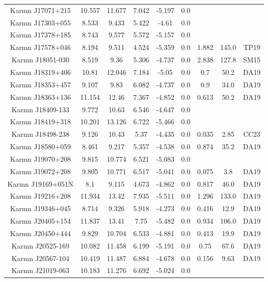\begin{longtable}{ccccccccc}
    Karmn J17071+215 & 10.557 & 11.677 & 7.042 & -5.197 & 0.0 &  &  &  \\
    Karmn J17303+055 & 8.533 & 9.433 & 5.422 & -4.61 & 0.0 &  &  &  \\
    Karmn J17378+185 & 8.743 & 9.577 & 5.572 & -5.157 & 0.0 &  &  &  \\
    Karmn J17578+046 & 8.194 & 9.511 & 4.524 & -5.359 & 0.0 & 1.882 & 145.0 & TP19 \\
    Karmn J18051-030 & 8.519 & 9.36 & 5.306 & -4.737 & 0.0 & 2.838 & 127.8 & SM15 \\
    Karmn J18319+406 & 10.81 & 12.046 & 7.184 & -5.05 & 0.0 & 0.7 & 50.2 & DA19 \\
    Karmn J18353+457 & 9.107 & 9.83 & 6.082 & -4.737 & 0.0 & 0.9 & 34.0 & DA19 \\
    Karmn J18363+136 & 11.154 & 12.46 & 7.367 & -4.852 & 0.0 & 0.613 & 50.2 & DA19 \\
    Karmn J18409-133 & 9.772 & 10.63 & 6.546 & -4.647 & 0.0 &  &  &  \\
    Karmn J18419+318 & 10.201 & 13.126 & 6.722 & -5.466 & 0.0 &  &  &  \\
    Karmn J18498-238 & 9.126 & 10.43 & 5.37 & -4.435 & 0.0 & 0.035 & 2.85 & CC23 \\
    Karmn J18580+059 & 8.461 & 9.217 & 5.357 & -4.538 & 0.0 & 0.874 & 35.2 & DA19 \\
    Karmn J19070+208 & 9.815 & 10.774 & 6.521 & -5.083 & 0.0 &  &  &  \\
    Karmn J19072+208 & 9.805 & 10.771 & 6.517 & -5.041 & 0.0 & 0.075 & 3.8 & DA19 \\
    Karmn J19169+051N & 8.1 & 9.115 & 4.673 & -4.862 & 0.0 & 0.817 & 46.0 & DA19 \\
    Karmn J19216+208 & 11.934 & 13.42 & 7.935 & -5.511 & 0.0 & 1.296 & 133.0 & DA19 \\
    Karmn J19346+045 & 8.714 & 9.326 & 5.918 & -4.273 & 0.0 & 0.416 & 12.9 & DA19 \\
    Karmn J20405+154 & 11.837 & 13.41 & 7.75 & -5.482 & 0.0 & 0.934 & 106.0 & DA19 \\
    Karmn J20450+444 & 9.829 & 10.704 & 6.533 & -4.881 & 0.0 & 0.413 & 19.9 & DA19 \\
    Karmn J20525-169 & 10.082 & 11.458 & 6.199 & -5.191 & 0.0 & 0.75 & 67.6 & DA19 \\
    Karmn J20567-104 & 10.419 & 11.487 & 6.884 & -4.678 & 0.0 & 0.156 & 9.63 & DA19 \\
    Karmn J21019-063 & 10.183 & 11.276 & 6.692 & -5.024 & 0.0 &  &  &  \\

\end{longtable}
